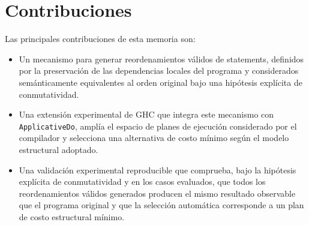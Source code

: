 
\section{Contribuciones}

Las principales contribuciones de esta memoria son:

\begin{itemize}
    \item Un mecanismo para generar reordenamientos válidos de statements, definidos por la preservación de las dependencias locales del programa y considerados semánticamente equivalentes al orden original bajo una hipótesis explícita de conmutatividad.
    \item Una extensión experimental de \textsf{GHC} que integra este mecanismo con \texttt{ApplicativeDo}, amplía el espacio de planes de ejecución considerado por el compilador y selecciona una alternativa de costo mínimo según el modelo estructural adoptado.
    \item Una validación experimental reproducible que comprueba, bajo la hipótesis explícita de conmutatividad y en los casos evaluados, que todos los reordenamientos válidos generados producen el mismo resultado observable que el programa original y que la selección automática corresponde a un plan de costo estructural mínimo.
\end{itemize}

